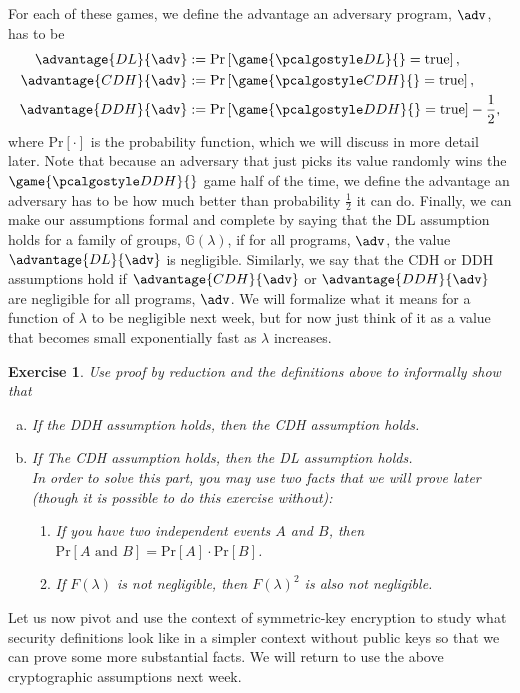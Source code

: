 \documentclass[12pt]{article}
\newcommand{\G}[0]{\mathbb{G}}
\newcommand{\pr}[1]{\text{Pr}\left[#1\right]}
\newtheorem{exercise}{Exercise}
\theoremstyle{definition}
\theoremstyle{remark}
\theoremstyle{definition}
\begin{document}
For each of these games, we define the advantage an adversary program, $\adv$, has to be
\begin{align*}
\advantage{DL}{\adv} &:= \pr{\game{\algo{DL}}{} = \text{true}},\\
\advantage{CDH}{\adv} &:= \pr{\game{\algo{CDH}}{} = \text{true}},\\
\advantage{DDH}{\adv} &:= \pr{\game{\algo{DDH}}{} = \text{true}} - \frac{1}{2},
\end{align*} where $\pr{\cdot}$ is the probability function, which we will discuss in more detail later. Note that because an adversary that just picks its value randomly wins the $\game{\algo{DDH}}{}$ game half of the time, we define the advantage an adversary has to be how much better than probability $\frac{1}{2}$ it can do. Finally, we can make our assumptions formal and complete by saying that the DL assumption holds for a family of groups, $\G(\lambda)$, if for all programs, $\adv$, the value $\advantage{DL}{\adv}$ is negligible. Similarly, we say that the CDH or DDH assumptions hold if $\advantage{CDH}{\adv}$ or $\advantage{DDH}{\adv}$ are negligible for all programs, $\adv$. We will formalize what it means for a function of $\lambda$ to be negligible next week, but for now just think of it as a value that becomes small exponentially fast as $\lambda$ increases.

\begin{exercise} Use proof by reduction and the definitions above to informally show that
\begin{enumerate}[(a)]
\item If the DDH assumption holds, then the CDH assumption holds.
\item If The CDH assumption holds, then the DL assumption holds.\\
In order to solve this part, you may use two facts that we will prove later (though it is possible to do this exercise without):
\begin{enumerate}[(1)]
\item If you have two independent events $A$ and $B$, then $\pr{A\text{ and }B} = \pr{A}\cdot\pr{B}$.
\item If $F(\lambda)$ is not negligible, then $F(\lambda)^2$ is also not negligible.
\end{enumerate}
\end{enumerate}
\end{exercise}

Let us now pivot and use the context of symmetric-key encryption to study what security definitions look like in a simpler context without public keys so that we can prove some more substantial facts. We will return to use the above cryptographic assumptions next week.\\
\end{document}
